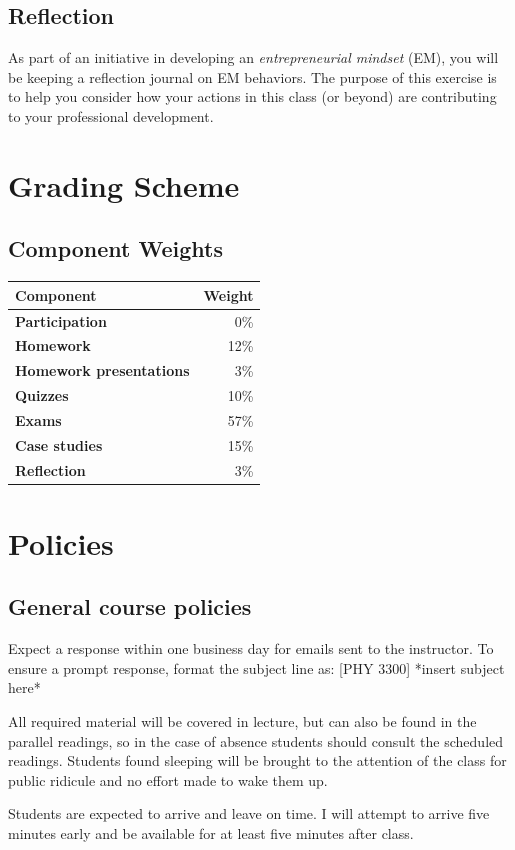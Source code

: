 \documentclass{syllabus}
\begin{document}
\subsection{Reflection}
As part of an initiative in developing an \emph{entrepreneurial mindset} (EM), you will be keeping a reflection journal on EM behaviors. The purpose of this exercise is to help you consider how your actions in this class (or beyond) are contributing to your professional development.

\section*{Grading Scheme}
\subsection*{Component Weights}

\noindent\begin{tabular}{lr}
\textbf{Component} & \textbf{Weight}       \\ \hline
\textbf{Participation}            & 0\%  \\
\textbf{Homework}            & 12\%       \\
\textbf{Homework presentations}            &     3\%   \\
\textbf{Quizzes}            & 10\%       \\
\textbf{Exams} & 57\% \\
\textbf{Case studies}            & 15\%\\
\textbf{Reflection} & 3\%
\end{tabular}%





\section*{Policies}
\subsection{General course policies}
Expect a response within one business day for emails sent to the instructor. To ensure a prompt response, format the subject line as: [PHY 3300] *insert subject here*

All required material will be covered in lecture, but can also be found in the parallel readings, so in the case of absence students should consult the scheduled readings. Students found sleeping will be brought to the attention of the class for public ridicule and no effort made to wake them up.

Students are expected to arrive and leave on time. I will attempt to arrive five minutes early and be available for at least five minutes after class.

\collegepolicies
\end{document}
